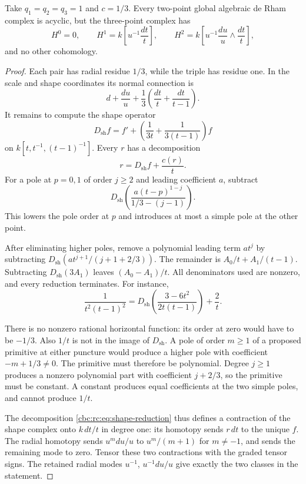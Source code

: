 \begin{proposition}\label{cbc:rc:prop:ternary-resonance}
Take \(q_1=q_2=q_3=1\) and \(c=1/3\).
Every two-point global algebraic de Rham complex is acyclic, but the
three-point complex has
\[
 H^0=0,\qquad
 H^1=k\left[u^{-1}\frac{dt}{t}\right],\qquad
 H^2=k\left[u^{-1}\frac{du}{u}\wedge\frac{dt}{t}\right],
\]
and no other cohomology.
\end{proposition}
\begin{proof}
Each pair has radial residue \(1/3\), while the triple has residue one.
In the scale and shape coordinates its normal connection is
\[
 d+\frac{du}{u}+\frac13\left(\frac{dt}{t}+\frac{dt}{t-1}\right).
\]
It remains to compute the shape operator
\[
 D_{\mathrm{sh}}f=f'+
 \left(\frac1{3t}+\frac1{3(t-1)}\right)f
\]
on \(k[t,t^{-1},(t-1)^{-1}]\).
Every \(r\) has a decomposition
\begin{equation}\label{cbc:rc:eq:shape-reduction}
 r=D_{\mathrm{sh}}f+\frac{c(r)}t.
\end{equation}
For a pole at \(p=0,1\) of order \(j\geq2\) and leading coefficient
\(a\), subtract
\[
 D_{\mathrm{sh}}\left(
 \frac{a(t-p)^{1-j}}{1/3-(j-1)}\right).
\]
This lowers the pole order at \(p\) and introduces at most a simple
pole at the other point.

After eliminating higher poles, remove a
polynomial leading term \(a t^j\) by subtracting
\(D_{\mathrm{sh}}(a t^{j+1}/(j+1+2/3))\).
The remainder is \(A_0/t+A_1/(t-1)\).  Subtracting
\(D_{\mathrm{sh}}(3A_1)\) leaves \((A_0-A_1)/t\).
All denominators used are nonzero, and every reduction terminates.
For instance,
\[
 \frac1{t^2(t-1)^2}=
 D_{\mathrm{sh}}\left(\frac{3-6t^2}{2t(t-1)}\right)+\frac2t.
\]

There is no nonzero rational horizontal function: its order at zero
would have to be \(-1/3\).
Also \(1/t\) is not in the image of \(D_{\mathrm{sh}}\).
A pole of order \(m\geq1\) of a proposed primitive at either puncture
would produce a higher pole with coefficient \(-m+1/3\ne0\).
The primitive must therefore be polynomial.  Degree \(j\geq1\)
produces a nonzero polynomial part with coefficient \(j+2/3\), so the
primitive must be constant.  A constant produces equal coefficients
at the two simple poles, and cannot produce \(1/t\).

The decomposition \eqref{cbc:rc:eq:shape-reduction} thus defines a
contraction of the shape complex onto \(k\,dt/t\) in degree one:
its homotopy sends \(r\,dt\) to the unique \(f\).
The radial homotopy sends \(u^mdu/u\) to \(u^m/(m+1)\) for
\(m\ne-1\), and sends the remaining mode to zero.
Tensor these two contractions with the graded tensor signs.
The retained radial modes \(u^{-1}\), \(u^{-1}du/u\) give exactly the
two classes in the statement.
\end{proof}

